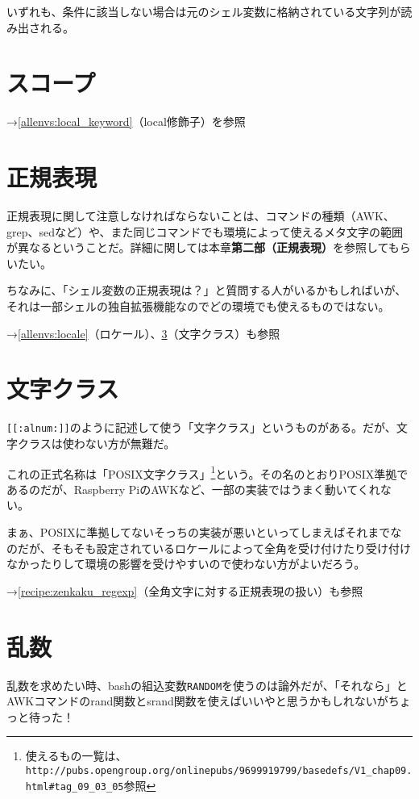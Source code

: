 いずれも、条件に該当しない場合は元のシェル変数に格納されている文字列が読み出される。

\section{スコープ}

\noindent
→\ref{allenvs:local_keyword}（local修飾子）を参照

\section{正規表現}
\label{allenvs:regexp}

正規表現に関して注意しなければならないことは、コマンドの種類（AWK、grep、sedなど）や、また同じコマンドでも環境によって使えるメタ文字の範囲が異なるということだ。詳細に関しては本章\textbf{第二部（正規表現）}を参照してもらいたい。

ちなみに、「シェル変数の正規表現は？」と質問する人がいるかもしればいが、それは一部シェルの独自拡張機能なのでどの環境でも使えるものではない。

\noindent
→\ref{allenvs:locale}（ロケール）、\ref{allenvs:letterclass}（文字クラス）も参照

\section{文字クラス}
\label{allenvs:letterclass}

\verb|[[:alnum:]]|のように記述して使う「文字クラス」というものがある。だが、文字クラスは使わない方が無難だ。

これの正式名称は「POSIX文字クラス」\footnote{使えるもの一覧は、\verb|http://pubs.opengroup.org/onlinepubs/9699919799/basedefs/V1_chap09.html#tag_09_03_05|参照}という。その名のとおりPOSIX準拠であるのだが、Raspberry PiのAWKなど、一部の実装ではうまく動いてくれない。

まぁ、POSIXに準拠してないそっちの実装が悪いといってしまえばそれまでなのだが、そもそも設定されているロケールによって全角を受け付けたり受け付けなかったりして環境の影響を受けやすいので使わない方がよいだろう。

\noindent
→\ref{recipe:zenkaku_regexp}（全角文字に対する正規表現の扱い）も参照

\section{乱数}
\label{allenvs:random_number}

乱数を求めたい時、bashの組込変数\verb|RANDOM|を使うのは論外だが、「それなら」とAWKコマンドのrand関数とsrand関数を使えばいいやと思うかもしれないがちょっと待った！

